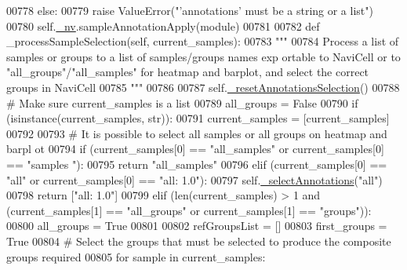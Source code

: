\begin{DoxyCode}
00778         \textcolor{keywordflow}{else}:
00779             \textcolor{keywordflow}{raise} ValueError(\textcolor{stringliteral}{"'annotations' must be a string or a list"})
00780         self.\hyperlink{classnavicom_1_1navicom_1_1NaviCom_afff3fd56fa16a68bab52ba8d801e325a}{_nv}.sampleAnnotationApply(module)
00781 
00782     \textcolor{keyword}{def }\_processSampleSelection(self, current\_samples):
00783         \textcolor{stringliteral}{"""}
00784 \textcolor{stringliteral}{        Process a list of samples or groups to a list of samples/groups names exp
      ortable to NaviCell or to "all\_groups"/"all\_samples" for heatmap and barplot, and
       select the correct groups in NaviCell}
00785 \textcolor{stringliteral}{        """}
00786 
00787         self.\hyperlink{classnavicom_1_1navicom_1_1NaviCom_a26866ef971b6bcb8b00ca742d47d0ea9}{_resetAnnotationsSelection}()
00788         \textcolor{comment}{# Make sure current\_samples is a list}
00789         all\_groups = \textcolor{keyword}{False}
00790         \textcolor{keywordflow}{if} (isinstance(current\_samples, str)):
00791             current\_samples = [current\_samples]
00792 
00793         \textcolor{comment}{# It is possible to select all samples or all groups on heatmap and barpl
      ot}
00794         \textcolor{keywordflow}{if} (current\_samples[0] == \textcolor{stringliteral}{"all\_samples"} \textcolor{keywordflow}{or} current\_samples[0] == \textcolor{stringliteral}{"samples
      "}):
00795             \textcolor{keywordflow}{return} \textcolor{stringliteral}{"all\_samples"}
00796         \textcolor{keywordflow}{elif} (current\_samples[0] == \textcolor{stringliteral}{"all"} \textcolor{keywordflow}{or} current\_samples[0] == \textcolor{stringliteral}{"all: 1.0"}):
00797             self.\hyperlink{classnavicom_1_1navicom_1_1NaviCom_a7e1aa831f14b151b7b5787c8b6128cef}{_selectAnnotations}(\textcolor{stringliteral}{"all"})
00798             \textcolor{keywordflow}{return} [\textcolor{stringliteral}{"all: 1.0"}]
00799         \textcolor{keywordflow}{elif} (len(current\_samples) > 1 \textcolor{keywordflow}{and} (current\_samples[1] == \textcolor{stringliteral}{"all\_groups"} \textcolor{keywordflow}{or
      } current\_samples[1] == \textcolor{stringliteral}{"groups"})):
00800             all\_groups = \textcolor{keyword}{True}
00801 
00802         refGroupsList = []
00803         first\_groups = \textcolor{keyword}{True}
00804         \textcolor{comment}{# Select the groups that must be selected to produce the composite groups
       required}
00805         \textcolor{keywordflow}{for} sample \textcolor{keywordflow}{in} current\_samples:

\end{DoxyCode}
